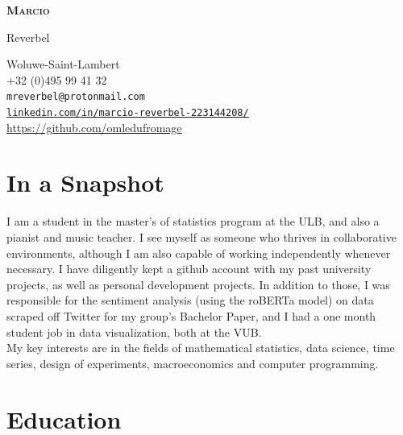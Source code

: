 \documentclass[12pt]{article}
\newcommand{\mycolor}{Fuchsia}
\newcommand{\thesectionicon}{}
\newcommand{\sectionicon}[1]{\renewcommand{\thesectionicon}{#1}}
\begin{document}
\begin{minipage}[t]{0.25\textwidth}
  {\sffamily\bfseries\scshape\huge
    Marcio
    
         \vspace{1ex}
     
    Reverbel}
\end{minipage}
\hfill
\begin{minipage}[t]{0.65\textwidth}
  \begin{small}
  \begin{flushright}
  Woluwe-Saint-Lambert\ \ \textcolor{\mycolor}{\faHome\\}
  +32 (0)495 99 41 32\ \ \textcolor{\mycolor}{\faPhone\\}
  \texttt{mreverbel@protonmail.com}\ \ \textcolor{\mycolor}{\faEnvelope\\}
  \href{https://linkedin.com/in/marcio-reverbel-223144208/}{\texttt{linkedin.com/in/marcio-reverbel-223144208/}}\ \ \textcolor{\mycolor}{\faLinkedin\\}
  \url{https://github.com/omledufromage}\ \ \textcolor{\mycolor}{\faGithub\\}
  \end{flushright}
  \end{small}
\end{minipage}

\sectionicon{\faUser}
\section{In a Snapshot}

I am a student in the master's of statistics program at the ULB, and also a pianist and music teacher. I see myself as someone who thrives in collaborative environments, although I am also capable of working independently whenever necessary. I have diligently kept a github account with my past university projects, as well as personal development projects. In addition to those, I was responsible for the sentiment analysis (using the roBERTa model) on data scraped off Twitter for my group's Bachelor Paper, and I had a one month student job in data visualization, both at the VUB. \\

My key interests are in the fields of mathematical statistics, data science, time series, design of experiments, macroeconomics and computer programming.

\sectionicon{\faGraduationCap}
\section{Education}
\end{document}
